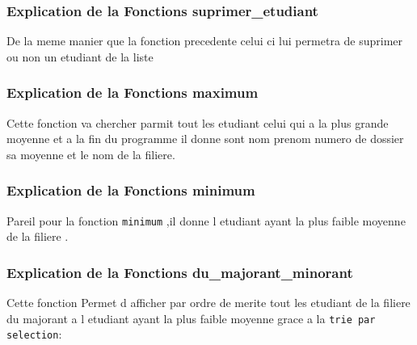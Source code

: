 \documentclass[12pt,a4paper]{article}
\begin{document}


\subsubsection{Explication de la Fonctions suprimer\_etudiant}
De la meme manier que la fonction precedente celui ci lui permetra de suprimer ou non un etudiant de la liste 










\subsubsection{Explication de la Fonctions maximum}
Cette fonction va chercher parmit tout les etudiant celui qui a la plus grande moyenne et a  la fin du programme il 
donne sont nom prenom numero de dossier sa moyenne et le nom de la filiere.










\subsubsection{Explication de la Fonctions minimum}
Pareil pour la fonction \texttt{minimum} ,il donne l etudiant ayant la plus faible moyenne de la filiere .












\subsubsection{Explication de la Fonctions du\_majorant\_minorant}
Cette fonction Permet d afficher par ordre de merite tout les etudiant de la filiere du majorant a l etudiant ayant la plus faible moyenne
grace a la \texttt{trie par selection}:

\end{document}
